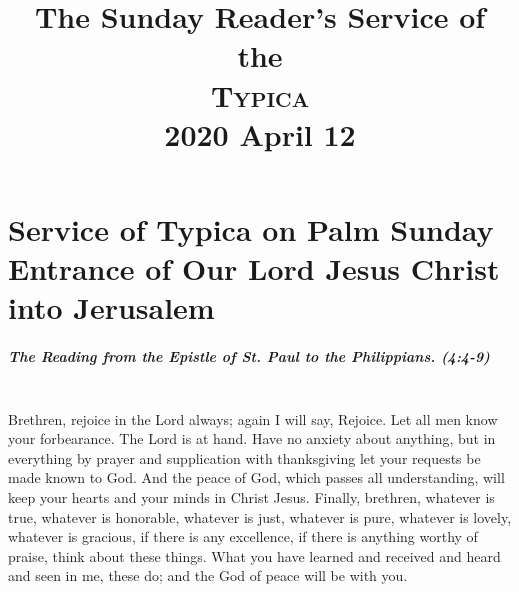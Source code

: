 \documentclass[twoside, letterpaper, 12pt]{report}
\title{The Sunday Reader's Service of the \\ \textsc{Typica} \\ 2020 April 12}
\date{}
\author{}
\begin{document}
\maketitle
\pagestyle{empty} %
\cleardoublepage
\pagestyle{plain}
\setcounter{page}{1} %
\chapter*{Service of Typica on Palm Sunday \\ Entrance of Our Lord Jesus Christ into Jerusalem}

\trisagionNeedsAmen[reader]







\paragraph{The Reading from the Epistle of St. Paul to the Philippians. (4:4-9)}\mbox{}\\

Brethren, rejoice in the Lord always; again I will say, Rejoice. Let all men know your
forbearance. The Lord is at hand. Have no anxiety about anything, but in everything by prayer and
supplication with thanksgiving let your requests be made known to God. And the peace of God,
which passes all understanding, will keep your hearts and your minds in Christ Jesus. Finally,
brethren, whatever is true, whatever is honorable, whatever is just, whatever is pure, whatever is
lovely, whatever is gracious, if there is any excellence, if there is anything worthy of praise, think
about these things. What you have learned and received and heard and seen in me, these do; and
the God of peace will be with you.
\end{document}
